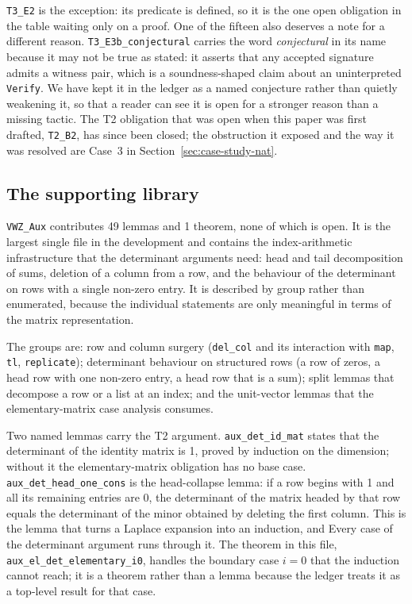 \texttt{T3\_E2} is the exception: its predicate is defined, so it is the one open
obligation in the table waiting only on a proof. One of the fifteen also deserves
a note for a different reason.
\texttt{T3\_E3b\_conjectural}
carries the word \emph{conjectural} in its name because it may not be true as
stated: it asserts that any accepted signature admits a witness pair, which is a
soundness-shaped claim about an uninterpreted \texttt{Verify}. We have kept it in
the ledger as a named conjecture rather than quietly weakening it, so that a
reader can see it is open for a stronger reason than a missing tactic. The T2
obligation that was open when this paper was first drafted, \texttt{T2\_B2}, has
since been closed; the obstruction it exposed and the way it was resolved are
Case~3 in Section~\ref{sec:case-study-nat}.

\subsection{The supporting library}

\texttt{VWZ\_Aux} contributes 49 lemmas and 1 theorem, none of which is open. It
is the largest single file in the development and contains the
index-arithmetic infrastructure that the determinant arguments need: head and
tail decomposition of sums, deletion of a column from a row, and the behaviour
of the determinant on rows with a single non-zero entry. It is described by
group rather than enumerated, because the individual statements are only
meaningful in terms of the matrix representation.

The groups are: row and column surgery (\texttt{del\_col} and its interaction
with \texttt{map}, \texttt{tl}, \texttt{replicate}); determinant behaviour on
structured rows (a row of zeros, a head row with one non-zero entry, a head row
that is a sum); split lemmas that decompose a row or a list at an index; and the
unit-vector lemmas that the elementary-matrix case analysis consumes.

Two named lemmas carry the T2 argument. \texttt{aux\_det\_id\_mat} states that
the determinant of the identity matrix is 1, proved by induction on the
dimension; without it the elementary-matrix obligation has no base case.
\texttt{aux\_det\_head\_one\_cons} is the head-collapse lemma: if a row begins
with 1 and all its remaining entries are 0, the determinant of the matrix headed
by that row equals the determinant of the minor obtained by deleting the first
column. This is the lemma that turns a Laplace expansion into an induction, and
Every case of the determinant argument runs through it. The theorem in this
file, \texttt{aux\_el\_det\_elementary\_i0}, handles the boundary case $i = 0$
that the induction cannot reach; it is a theorem rather than a lemma because the
ledger treats it as a top-level result for that case.

